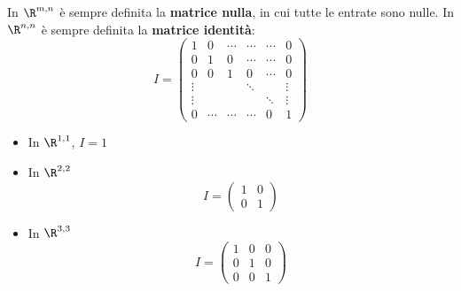 \documentclass[twoside, 11pt, titlepage]{article}
\begin{document}

In  $\R^{m,n}$ è sempre definita la \textbf{matrice nulla}, in cui tutte le entrate sono nulle. In $\R^{n,n}$ è sempre definita la \textbf{matrice identità}:
\[
I=\begin{pmatrix}
1 & 0 & \cdots & \cdots & \cdots & 0 \\
0 & 1 & 0 & \cdots & \cdots & 0 \\
0 & 0 & 1 & 0 &\cdots & 0 \\
\vdots & & & \ddots & & \vdots \\
\vdots & & & & \ddots & \vdots \\
0 & \cdots & \cdots & \cdots & 0 & 1
\end{pmatrix}
\]
\begin{itemize}
\item In $\R^{1,1}$, $I=1$
\item In $\R^{2,2}$
\[
I=\begin{pmatrix}
1 & 0 \\
0 & 1
\end{pmatrix}
\]
\item In $\R^{3,3}$
\[
I=\begin{pmatrix}
1 & 0 & 0 \\
0 & 1 & 0 \\
0 & 0 & 1
\end{pmatrix}
\]
\end{itemize}
\end{document}
